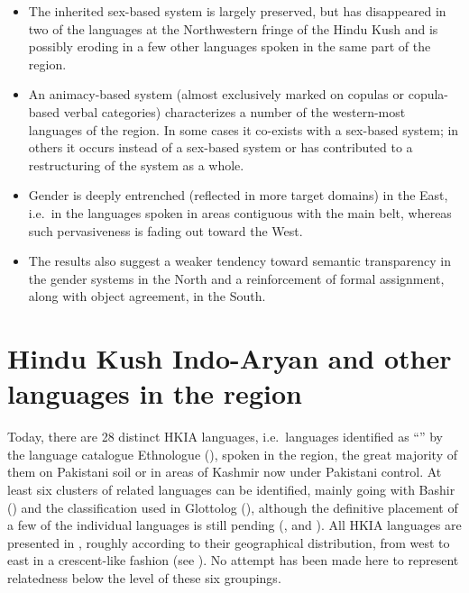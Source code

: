 \documentclass[output=collectionpaper]{langsci/langscibook}
\begin{document}
\begin{itemize}
\item
The inherited sex-based system is largely preserved, but has disappeared in two of the languages at the Northwestern fringe of the Hindu Kush and is possibly eroding in a few other languages spoken in the same part of the region.
\item
An animacy-based system (almost exclusively marked on copulas or copula-based verbal categories) characterizes a number of the western-most languages of the region. In some cases it co-exists with a sex-based system; in others it occurs instead of a sex-based system or has contributed to a restructuring of the system as a whole.
\item
Gender is deeply entrenched (reflected in more target domains) in the East, i.e.\ in the languages spoken in areas contiguous with the main  belt, whereas such pervasiveness is fading out toward the West.
\item
The results also suggest a weaker tendency toward semantic transparency in the gender systems in the North and a reinforcement of formal assignment, along with object agreement, in the South.
\end{itemize}


\section{Hindu Kush Indo-Aryan and other languages in the region}

Today, there are 28 distinct HKIA languages, i.e.\ languages identified as ``'' by the language catalogue Ethnologue (\citealt{Eberhard2019}), spoken in the region, the great majority of them on Pakistani soil or in areas of Kashmir now under Pakistani control. At least six clusters of related languages can be identified, mainly going with Bashir (\citeyear[824--825]{Bashir2003}) and the classification used in Glottolog (\citealt{Hammarstroem2018}), although the definitive placement of a few of the individual languages is still pending (,  and ). All HKIA languages are presented in , roughly according to their geographical distribution, from west to east in a crescent-like fashion (see ). No attempt has been made here to represent relatedness below the level of these six groupings.
\end{document}
